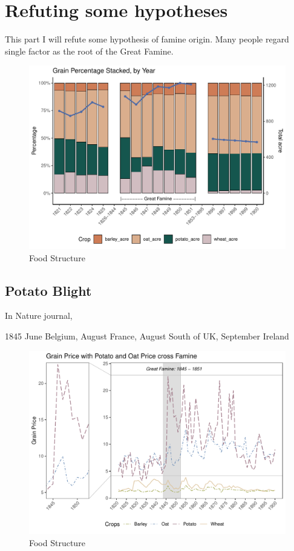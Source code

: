 \section{Refuting some hypotheses}

This part I will refute some hypothesis of famine origin. Many people regard single factor as the root of the Great Famine.

\begin{figure}[h]
    \centering
    \caption{Food Structure}
    \includegraphics[width=.95\textwidth]{../03_outputs/food_structure.pdf}
\end{figure}

\subsection{Potato Blight}

In Nature journal,

1845 June Belgium, August France, August South of UK, September Ireland

\begin{figure}[h]
    \centering
    \caption{Food Structure}
    \includegraphics[width=.95\textwidth]{../03_outputs/grain_price.pdf}
\end{figure}



